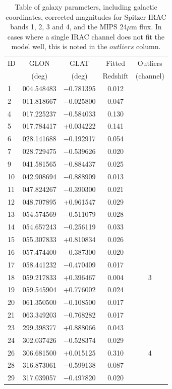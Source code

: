 \documentclass[times,usenatbib]{mn2e}
\begin{document}
\begin{table}
\begin{center}
\caption{Table of galaxy parameters, including galactic coordinates, corrected magnitudes for Spitzer IRAC bands 1, 2, 3 and 4, and the MIPS 24$\mu$m flux. In cases where a single IRAC channel does not fit the model well, this is noted in the $outliers$ column.}
\begin{tabular}{lcccc}
\hline
ID & GLON & GLAT & Fitted & Outliers \\
 & (deg) & (deg) & Redshift & (channel) \\
\hline
 1 & 004.548483 & $-$0.781395 & 0.012 &   \\
 2 & 011.818667 & $-$0.025800 & 0.047 &   \\
 4 & 017.225237 & $-$0.584033 & 0.130 &   \\
 5 & 017.784417 &   +0.034222 & 0.141 &   \\
 6 & 028.141688 & $-$0.192917 & 0.054 &   \\
 7 & 028.729475 & $-$0.539626 & 0.020 &   \\
 9 & 041.581565 & $-$0.884437 & 0.025 &   \\
10 & 042.908694 & $-$0.888909 & 0.013 &   \\
11 & 047.824267 & $-$0.390300 & 0.021 &   \\
12 & 048.707895 &   +0.961547 & 0.029 &   \\
13 & 054.574569 & $-$0.511079 & 0.028 &   \\
14 & 054.657243 & $-$0.256119 & 0.033 &   \\
15 & 055.307833 &   +0.810834 & 0.026 &   \\
16 & 057.474400 & $-$0.387300 & 0.020 &   \\
17 & 058.441232 & $-$0.470409 & 0.017 &   \\
18 & 059.217833 &   +0.396467 & 0.004 & 3 \\
19 & 059.545904 &   +0.776002 & 0.024 &   \\
20 & 061.350500 & $-$0.108500 & 0.017 &   \\
21 & 063.349203 & $-$0.768282 & 0.017 &   \\
23 & 299.398377 &   +0.888066 & 0.043 &   \\
24 & 302.037426 & $-$0.528374 & 0.029 &   \\
26 & 306.681500 &   +0.015125 & 0.310 & 4 \\
28 & 316.873061 & $-$0.599138 & 0.087 &   \\
29 & 317.039057 & $-$0.497820 & 0.020 &   \\

\end{tabular}
\end{center}
\end{table}
\end{document}
